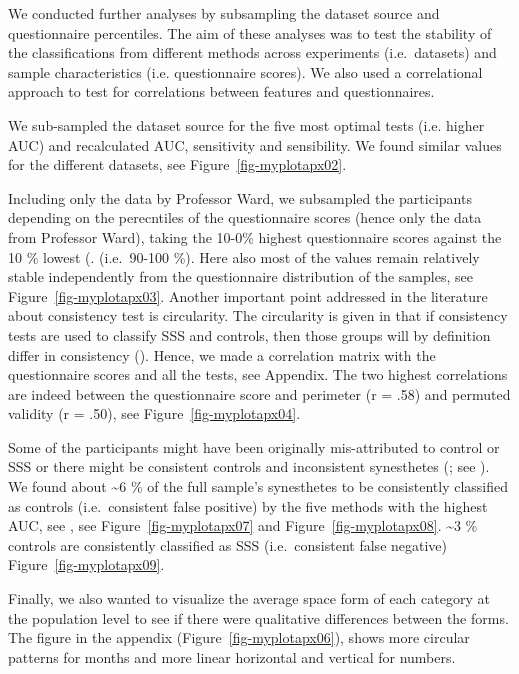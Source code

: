 \documentclass[
  man,
  longtable,
  a4paper,
  nolmodern,
  notxfonts,
  notimes,
  colorlinks=true,linkcolor=blue,citecolor=blue,urlcolor=blue]{apa7}
\begin{document}
We conducted further analyses by subsampling the dataset source and
questionnaire percentiles. The aim of these analyses was to test the
stability of the classifications from different methods across
experiments (i.e.~datasets) and sample characteristics (i.e.
questionnaire scores). We also used a correlational approach to test for
correlations between features and questionnaires.

We sub-sampled the dataset source for the five most optimal tests (i.e.
higher AUC) and recalculated AUC, sensitivity and sensibility. We found
similar values for the different datasets, see
Figure~\ref{fig-myplotapx02}.

Including only the data by Professor Ward, we subsampled the
participants depending on the perecntiles of the questionnaire scores
(hence only the data from Professor Ward), taking the 10-0\% highest
questionnaire scores against the 10 \% lowest (. (i.e.~90-100 \%). Here
also most of the values remain relatively stable independently from the
questionnaire distribution of the samples, see
Figure~\ref{fig-myplotapx03}. Another important point addressed in the
literature about consistency test is circularity. The circularity is
given in that if consistency tests are used to classify SSS and
controls, then those groups will by definition differ in consistency
(). Hence, we made a
correlation matrix with the questionnaire scores and all the tests, see
Appendix. The two highest correlations are indeed between the
questionnaire score and perimeter (r = .58) and permuted validity (r =
.50), see Figure~\ref{fig-myplotapx04}.

Some of the participants might have been originally mis-attributed to
control or SSS or there might be consistent controls and inconsistent
synesthetes (; see
). We found about
\textasciitilde6 \% of the full sample's synesthetes to be consistently
classified as controls (i.e.~consistent false positive) by the five
methods with the highest AUC, see , see Figure~\ref{fig-myplotapx07} and
Figure~\ref{fig-myplotapx08}. \textasciitilde3 \% controls are
consistently classified as SSS (i.e.~consistent false negative)
Figure~\ref{fig-myplotapx09}.

Finally, we also wanted to visualize the average space form of each
category at the population level to see if there were qualitative
differences between the forms. The figure in the appendix
(Figure~\ref{fig-myplotapx06}), shows more circular patterns for months
and more linear horizontal and vertical for numbers.
\end{document}
